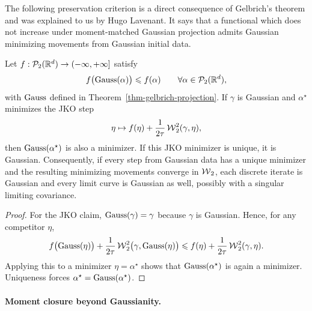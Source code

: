 The following preservation criterion is a direct consequence of Gelbrich's theorem and was explained to us by Hugo Lavenant. It says that a functional which does not increase under moment-matched Gaussian projection admits Gaussian minimizing movements from Gaussian initial data.

\begin{thm}\label{thm-lavenant-gaussian-preserving-jko}
	Let $f:\mathcal{P}_2(\mathbb{R}^d)\to(-\infty,+\infty]$ satisfy
	\[
		f\bigl(\operatorname{Gauss}(\alpha)\bigr)\leqslant f(\alpha)
		\qquad\forall\alpha\in\mathcal{P}_2(\mathbb{R}^d),
	\]
	with $\operatorname{Gauss}$ defined in Theorem~\ref{thm-gelbrich-projection}. If $\gamma$ is Gaussian and $\alpha^\star$ minimizes the JKO step
	\[
		\eta\mapsto f(\eta)+\frac1{2\tau}\operatorname{\mathcal{W}}_2^2(\gamma,\eta),
	\]
	then $\operatorname{Gauss}(\alpha^\star)$ is also a minimizer. If this JKO minimizer is unique, it is Gaussian. Consequently, if every step from Gaussian data has a unique minimizer and the resulting minimizing movements converge in $\operatorname{\mathcal{W}}_2$, each discrete iterate is Gaussian and every limit curve is Gaussian as well, possibly with a singular limiting covariance.
\end{thm}

\begin{proof}
	For the JKO claim, $\operatorname{Gauss}(\gamma)=\gamma$ because $\gamma$ is Gaussian. Hence, for any competitor $\eta$,
	\[
		f\bigl(\operatorname{Gauss}(\eta)\bigr)+\frac1{2\tau}\operatorname{\mathcal{W}}_2^2\bigl(\gamma,\operatorname{Gauss}(\eta)\bigr)
		\leqslant
		f(\eta)+\frac1{2\tau}\operatorname{\mathcal{W}}_2^2(\gamma,\eta).
	\]
	Applying this to a minimizer $\eta=\alpha^\star$ shows that $\operatorname{Gauss}(\alpha^\star)$ is again a minimizer. Uniqueness forces $\alpha^\star=\operatorname{Gauss}(\alpha^\star)$.
\end{proof}

\paragraph{Moment closure beyond Gaussianity.}

